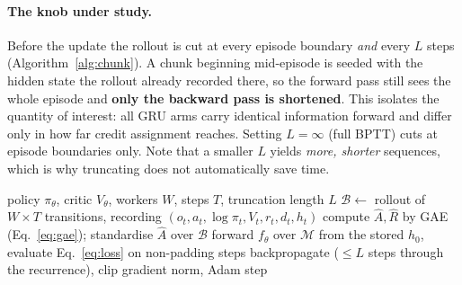\documentclass{article}
\begin{document}
\paragraph{The knob under study.} Before the update the rollout is cut at every
episode boundary \emph{and} every $L$ steps (Algorithm~\ref{alg:chunk}). A chunk
beginning mid-episode is seeded with the hidden state the rollout already
recorded there, so the forward pass still sees the whole episode and
\textbf{only the backward pass is shortened}. This isolates the quantity of
interest: all GRU arms carry identical information forward and differ only in how
far credit assignment reaches. Setting $L=\infty$ (full BPTT) cuts at episode
boundaries only. Note that a smaller $L$ yields \emph{more, shorter} sequences,
which is why truncating does not automatically save time.

\begin{algorithm}[H]
    \caption{One PPO iteration with truncation length $L$. {\color{orange}The
    highlighted line is the only difference between arms.}}
    \label{alg:chunk}
    \begin{algorithmic}[1]
        \Require policy $\pi_\theta$, critic $V_\theta$, workers $W$, steps $T$, truncation length $L$
        \State $\mathcal{B} \gets$ rollout of $W \times T$ transitions, recording $(o_t, a_t, \log \pi_t, V_t, r_t, d_t, h_t)$
        \State compute $\hat{A}, \hat{R}$ by GAE (Eq.~\ref{eq:gae}); standardise $\hat{A}$ over $\mathcal{B}$
            \State forward $f_\theta$ over $\mathcal{M}$ from the stored $h_0$, evaluate Eq.~\ref{eq:loss} on non-padding steps
            \State backpropagate ($\le L$ steps through the recurrence), clip gradient norm, Adam step
        \EndFor
    \end{algorithmic}
\end{algorithm}
\end{document}
